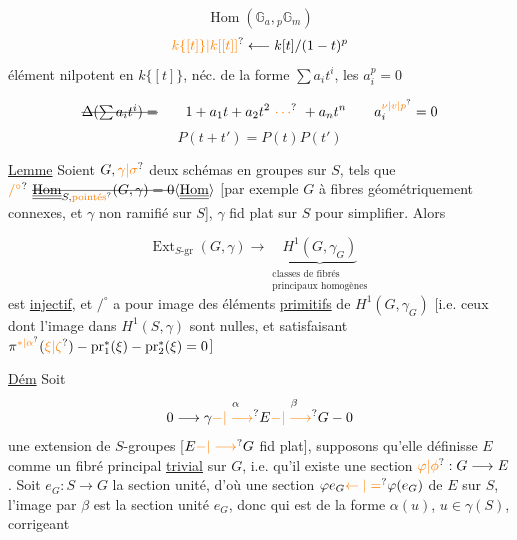 
\[
\operatorname{Hom}(\mathbb G_a,{}_p\mathbb G_m)
\]
\[
\unsure{k\{[t]\}|k[[t]]}\longleftarrow k[t]/(1-t)^p
\]
élément nilpotent en $k\{[t]\}$, néc. de la forme $\sum a_i t^i$, les $a_i^p=0$

\[
\deleted{\Delta(\sum a_i t^i)=}\qquad 1+a_1t+a_2t^2\ \unsure{\cdots}\ +a_nt^n\qquad a_i^{\unsure{\nu|v|p}}=0
\]
\[
P(t+t')=P(t)P(t')
\]


\uline{Lemme} Soient $G,\unsure{\gamma|\sigma}$ deux schémas en groupes  sur $S$, tels que $\unsure{/^{\circ}}\ \deleted{\underline{\underline{\operatorname{Hom}}}_{S,\unsure{\text{pointés}}}(G,\gamma)=0}\inserted{\underline{\underline{\operatorname{Hom}}}}$ [par exemple $G$ à fibres géométriquement connexes, et $\gamma$ non ramifié sur $S$], $\gamma$ fid plat sur $S$ pour simplifier. Alors

\[
\operatorname{Ext}_{S\text{-gr}}(G,\gamma)\longrightarrow\underbrace{H^1(G,\gamma_G)}_{\substack{\text{classes de fibrés}\\\text{principaux homogènes}}}\tag*{(*)}
\]
est \uline{injectif}, et $/^{\circ}$ a pour image  des éléments \uline{primitifs} de $H^1(G,\gamma_G)$ [i.e. ceux dont l'image dans $H^1(S,\gamma)$ sont nulles, et satisfaisant $\pi^{\unsure{*|\alpha}}(\unsure{\xi|\zeta})-\operatorname{pr}_1^*(\xi)-\operatorname{pr}_2^*(\xi)=0$]


\uline{Dém} Soit
\[
0\longrightarrow\gamma\overset{\alpha}{\unsure{-|\longrightarrow}}E\overset{\beta}{\unsure{-|\longrightarrow}}G-0
\]
une extension de $S$-groupes [$E\unsure{-|\longrightarrow}G$ fid plat], supposons qu'elle définisse $E$ comme un fibré principal \uline{trivial} sur $G$, i.e. qu'il existe une section $\unsure{\varphi|\phi}:G\longrightarrow E$. Soit $e_G:S\longrightarrow G$ la section unité, d'où une section $\varphi e_G\unsure{\leftarrow|=}\varphi(e_G)$ de $E$ sur $S$,  l'image par $\beta$ est la section unité $e_G$, donc qui est de la forme $\alpha(u)$, $u\in\gamma(S)$, corrigeant

